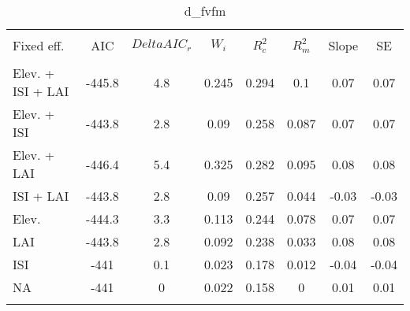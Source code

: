 
\begin{table}[!htbp] \centering 
  \caption{d_fvfm} 
  \label{d_fvfm} 
\begin{tabular}{@{\extracolsep{5pt}} lS[table-format=3.2]S[table-format=3.2]S[table-format=3.2]S[table-format=3.2]S[table-format=3.2]S[table-format=3.2]S[table-format=3.2]} 
\\[-1.8ex]\hline 
\hline \\[-1.8ex] 
{Fixed eff.} & {AIC} & {$Delta{}AIC_r$} & {$W_i$} & {$R^2_c$} & {$R^2_m$} & {Slope} & {SE} \\
\hline \\[-1.8ex] 
Elev. + ISI + LAI & -445.8 & 4.8 & 0.245 & 0.294 & 0.1 & 0.07 & 0.07 \\ 
Elev. + ISI & -443.8 & 2.8 & 0.09 & 0.258 & 0.087 & 0.07 & 0.07 \\ 
Elev. + LAI & -446.4 & 5.4 & 0.325 & 0.282 & 0.095 & 0.08 & 0.08 \\ 
ISI + LAI & -443.8 & 2.8 & 0.09 & 0.257 & 0.044 & -0.03 & -0.03 \\ 
Elev. & -444.3 & 3.3 & 0.113 & 0.244 & 0.078 & 0.07 & 0.07 \\ 
LAI & -443.8 & 2.8 & 0.092 & 0.238 & 0.033 & 0.08 & 0.08 \\ 
ISI & -441 & 0.1 & 0.023 & 0.178 & 0.012 & -0.04 & -0.04 \\ 
NA & -441 & 0 & 0.022 & 0.158 & 0 & 0.01 & 0.01 \\ 
\hline \\[-1.8ex] 
\end{tabular} 
\end{table} 
